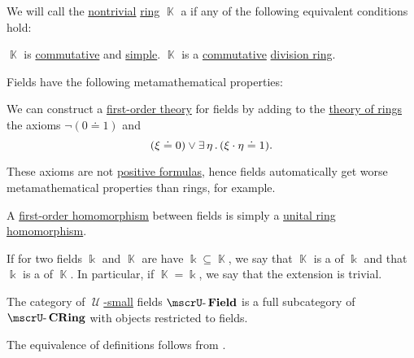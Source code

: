 \begin{definition}\label{def:field}
  We will call the \hyperref[def:ring/trivial]{nontrivial} \hyperref[def:ring]{ring} \( \BbbK \) a  if any of the following equivalent conditions hold:
  \begin{thmenum}
     \( \BbbK \) is \hyperref[def:ring/commutative]{commutative} and \hyperref[def:simple_object]{simple}.
     \( \BbbK \) is a \hyperref[def:ring/commutative]{commutative} \hyperref[def:division_ring]{division ring}.
  \end{thmenum}

  Fields have the following metamathematical properties:
  \begin{thmenum}
     We can construct a \hyperref[def:first_order_theory]{first-order theory} for fields by adding to the \hyperref[def:semiring/theory]{theory of rings} the axioms \( \neg (0 \doteq 1) \) and
    \begin{equation}\label{eq:def:field/theory/invertibility}
      (\xi \doteq 0) \vee \exists \thinspace \eta \thinspace . \thinspace (\xi \cdot \eta \doteq 1).
    \end{equation}

    These axioms are not \hyperref[def:positive_formula]{positive formulas}, hence fields automatically get worse metamathematical properties than rings, for example.

     A \hyperref[def:first_order_homomorphism]{first-order homomorphism} between fields is simply a \hyperref[def:ring/homomorphism]{unital ring homomorphism}.

     If for two fields \( \Bbbk \) and \( \BbbK \) are have \( \Bbbk \subseteq \BbbK \), we say that \( \BbbK \) is a  of \( \Bbbk \) and that \( \Bbbk \) is a  of \( \BbbK \). In particular, if \( \BbbK = \Bbbk \), we say that the extension is trivial.

     The category of \hyperref[def:large_and_small_sets]{\( \mscrU \)-small} fields \( \ucat{Field} \) is a full subcategory of \hyperref[def:ring/category]{\( \ucat{CRing} \)} with objects restricted to fields.
  \end{thmenum}
\end{definition}
\begin{defproof}
  The equivalence of definitions follows from .
\end{defproof}
